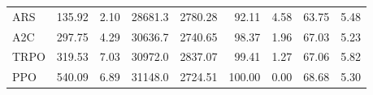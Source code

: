 \begin{samepage}
\begin{center}
\begin{tabular}{l|rr|rr|rr|rr}
    ARS          &   135.92 &     2.10 &    28681.3 &    2780.28 &   92.11 &    4.58 &   63.75 &    5.48 \\
    A2C          &   297.75 &     4.29 &    30636.7 &    2740.65 &   98.37 &    1.96 &   67.03 &    5.23 \\
    TRPO         &   319.53 &     7.03 &    30972.0 &    2837.07 &   99.41 &    1.27 &   67.06 &    5.82 \\
    PPO          &   540.09 &     6.89 &    31148.0 &    2724.51 &  100.00 &    0.00 &   68.68 &    5.30 \\
    \bottomrule
  \end{tabular}
\end{center}
\end{samepage}

